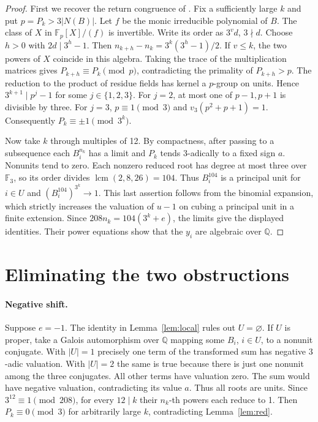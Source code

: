 \documentclass[11pt]{article}
\begin{document}
\begin{proof}
First we recover the return congruence of \cite{keio}. Fix a sufficiently large $k$ and put $p=P_k>3|N(B)|$. Let $f$ be the monic irreducible polynomial of $B$. The class of $X$ in $\mathbb F_p[X]/(f)$ is invertible. Write its order as $3^v d$, $3\nmid d$. Choose $h>0$ with $2d\mid 3^h-1$. Then $n_{k+h}-n_k=3^k(3^h-1)/2$. If $v\le k$, the two powers of $X$ coincide in this algebra. Taking the trace of the multiplication matrices gives $P_{k+h}\equiv P_k\pmod p$, contradicting the primality of $P_{k+h}>p$. The reduction to the product of residue fields has kernel a $p$-group on units. Hence $3^{k+1}\mid p^j-1$ for some $j\in\{1,2,3\}$. For $j=2$, at most one of $p-1,p+1$ is divisible by three. For $j=3$, $p\equiv1\pmod3$ and $v_3(p^2+p+1)=1$. Consequently $P_k\equiv\pm1\pmod {3^k}$.

Now take $k$ through multiples of 12. By compactness, after passing to a subsequence each $B_i^{n_k}$ has a limit and $P_k$ tends $3$-adically to a fixed sign $a$. Nonunits tend to zero. Each nonzero reduced root has degree at most three over $\mathbb F_3$, so its order divides $\operatorname{lcm}(2,8,26)=104$. Thus $B_i^{104}$ is a principal unit for $i\in U$ and $(B_i^{104})^{3^k}\to1$. This last assertion follows from the binomial expansion, which strictly increases the valuation of $u-1$ on cubing a principal unit in a finite extension. Since $208n_k=104(3^k+e)$, the limits give the displayed identities. Their power equations show that the $y_i$ are algebraic over $\mathbb Q$.
\end{proof}

\section{Eliminating the two obstructions}
\paragraph{Negative shift.}
Suppose $e=-1$. The identity in Lemma~\ref{lem:local} rules out $U=\varnothing$. If $U$ is proper, take a Galois automorphism over $\mathbb Q$ mapping some $B_i$, $i\in U$, to a nonunit conjugate. With $|U|=1$ precisely one term of the transformed sum has negative $3$-adic valuation. With $|U|=2$ the same is true because there is just one nonunit among the three conjugates. All other terms have valuation zero. The sum would have negative valuation, contradicting its value $a$. Thus all roots are units. Since $3^{12}\equiv1\pmod{208}$, for every $12\mid k$ their $n_k$-th powers each reduce to 1. Then $P_k\equiv0\pmod3$ for arbitrarily large $k$, contradicting Lemma~\ref{lem:red}.
\end{document}
